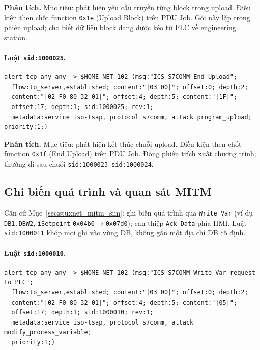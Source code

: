\documentclass[../main.tex]{subfiles}
\begin{document}
\noindent\textbf{Phân tích.}
Mục tiêu: phát hiện yêu cầu truyền từng block trong upload. Điều kiện then chốt function \texttt{0x1e} (Upload Block) trên PDU Job. Gói này lặp trong phiên upload; cho biết dữ liệu block đang được kéo từ PLC về engineering station.

\paragraph{Luật \texttt{sid:1000025}.}
\begin{footnotesize}
\begin{verbatim}
alert tcp any any -> $HOME_NET 102 (msg:"ICS S7COMM End Upload";
  flow:to_server,established; content:"|03 00|"; offset:0; depth:2;
  content:"|02 F0 80 32 01|"; offset:4; depth:5; content:"|1F|";
  offset:17; depth:1; sid:1000025; rev:1;
  metadata:service iso-tsap, protocol s7comm, attack program_upload; priority:1;)
\end{verbatim}
\end{footnotesize}

\noindent\textbf{Phân tích.}
Mục tiêu: phát hiện kết thúc chuỗi upload. Điều kiện then chốt function \texttt{0x1f} (End Upload) trên PDU Job. Đóng phiên trích xuất chương trình; thường đi sau chuỗi \texttt{sid:1000023}--\texttt{sid:1000024}.

\subsection{Ghi biến quá trình và quan sát MITM}
\label{sec:rules-stuxnet}

Căn cứ Mục~\ref{sec:stuxnet_mitm_sim}: ghi biến quá trình qua \texttt{Write Var} (ví dụ \texttt{DB1.DBW2}, \texttt{iSetpoint} \texttt{0x04b0}$\rightarrow$\texttt{0x07d0}); can thiệp \texttt{Ack\_Data} phía HMI. Luật \texttt{sid:1000011} khớp mọi ghi vào vùng DB, không gắn một địa chỉ DB cố định.

\paragraph{Luật \texttt{sid:1000010}.}
\begin{footnotesize}
\begin{verbatim}
alert tcp any any -> $HOME_NET 102 (msg:"ICS S7COMM Write Var request to PLC";
  flow:to_server,established; content:"|03 00|"; offset:0; depth:2;
  content:"|02 F0 80 32 01|"; offset:4; depth:5; content:"|05|";
  offset:17; depth:1; sid:1000010; rev:1;
  metadata:service iso-tsap, protocol s7comm, attack modify_process_variable;
  priority:1;)
\end{verbatim}
\end{footnotesize}
\end{document}
